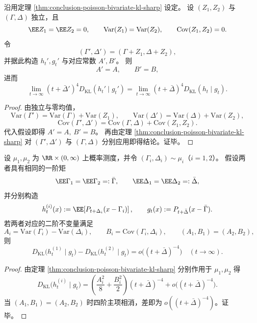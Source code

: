 \begin{proposition}\label{prop:conclusion-poisson-bivariate-isotropic-noise-invariance}
沿用定理 \ref{thm:conclusion-poisson-bivariate-kl-sharp} 设定。
设 \((Z_1,Z_2)\) 与 \((\Gamma,\Delta)\) 独立，且
\[
\EE Z_1=\EE Z_2=0,\qquad
\mathrm{Var}(Z_1)=\mathrm{Var}(Z_2),\qquad
\mathrm{Cov}(Z_1,Z_2)=0.
\]
令
\[
(\Gamma',\Delta')=(\Gamma+Z_1,\Delta+Z_2),
\]
并据此构造 \(h_t',g_t'\) 与对应常数 \(A',B'\)。
则
\[
A'=A,\qquad B'=B,
\]
进而
\[
\lim_{t\to\infty}(t+\bar\Delta')^4D_{\mathrm{KL}}(h_t'\mid g_t')
=\lim_{t\to\infty}(t+\bar\Delta)^4D_{\mathrm{KL}}(h_t\mid g_t).
\]
\end{proposition}
\begin{proof}
由独立与零均值，
\[
\mathrm{Var}(\Gamma')=\mathrm{Var}(\Gamma)+\mathrm{Var}(Z_1),\qquad
\mathrm{Var}(\Delta')=\mathrm{Var}(\Delta)+\mathrm{Var}(Z_2),
\]
\[
\mathrm{Cov}(\Gamma',\Delta')=\mathrm{Cov}(\Gamma,\Delta)+\mathrm{Cov}(Z_1,Z_2).
\]
代入假设即得 \(A'=A,\ B'=B\)。
再由定理 \ref{thm:conclusion-poisson-bivariate-kl-sharp} 对 \((\Gamma',\Delta')\) 与 \((\Gamma,\Delta)\) 分别应用即得结论。证毕。
\end{proof}

\begin{proposition}\label{prop:conclusion-poisson-bivariate-nohair}
设 \(\mu_1,\mu_2\) 为 \(\RR\times(0,\infty)\) 上概率测度，并令 \((\Gamma_i,\Delta_i)\sim\mu_i\)（\(i=1,2\)）。
假设两者具有相同的一阶矩
\[
\EE\Gamma_1=\EE\Gamma_2=:\bar\Gamma,\qquad
\EE\Delta_1=\EE\Delta_2=:\bar\Delta,
\]
并分别构造
\[
h_t^{(i)}(x):=\EE\!\left[P_{t+\Delta_i}(x-\Gamma_i)\right],
\qquad
g_t(x):=P_{t+\bar\Delta}(x-\bar\Gamma).
\]
若两者对应的二阶不变量满足
\[
A_i=\mathrm{Var}(\Gamma_i)-\mathrm{Var}(\Delta_i),\qquad
B_i=\mathrm{Cov}(\Gamma_i,\Delta_i),
\qquad
(A_1,B_1)=(A_2,B_2),
\]
则
\[
D_{\mathrm{KL}}\!\bigl(h_t^{(1)}\mid g_t\bigr)-D_{\mathrm{KL}}\!\bigl(h_t^{(2)}\mid g_t\bigr)
=o\bigl((t+\bar\Delta)^{-4}\bigr)\quad(t\to\infty).
\]
\end{proposition}
\begin{proof}
由定理 \ref{thm:conclusion-poisson-bivariate-kl-sharp} 分别作用于 \(\mu_1,\mu_2\) 得
\[
D_{\mathrm{KL}}\!\bigl(h_t^{(i)}\mid g_t\bigr)
=\left(\frac{A_i^2}{8}+\frac{B_i^2}{2}\right)(t+\bar\Delta)^{-4}+o\bigl((t+\bar\Delta)^{-4}\bigr).
\]
当 \((A_1,B_1)=(A_2,B_2)\) 时四阶主项相消，差即为 \(o((t+\bar\Delta)^{-4})\)。证毕。
\end{proof}



